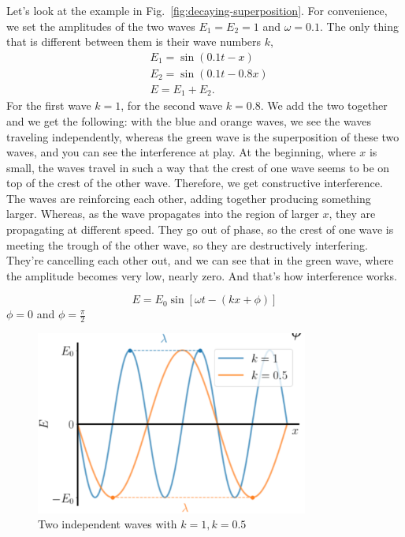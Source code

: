 Let's look at the example in Fig.~\ref{fig:decaying-superposition}. For convenience, we set the amplitudes of the two waves $E_1 = E_2 = 1$ and $\omega = 0.1$. The only thing that is different between them is their wave numbers $k$,
\begin{equation}
\begin{aligned}
&E_{1}=\sin (0.1 t-x) \\
&E_{2}=\sin (0.1 t-0.8 x) \\
&E=E_{1}+E_{2}.
\end{aligned}
\end{equation}
For the first wave $k=1$, for the second wave $k=0.8$. We add the two together and we get the following: with the blue and orange waves, we see the waves traveling independently, whereas the green wave is the superposition of these two waves, and you can see the interference at play. At the beginning, where $x$ is small, the waves travel in such a way that the crest of one wave seems to be on top of the crest of the other wave. Therefore, we get constructive interference. The waves are reinforcing each other, adding together producing something larger. Whereas, as the wave propagates into the region of larger $x$, they are propagating at different speed. They go out of phase, so the crest of one wave is meeting the trough of the other wave, so they are destructively interfering. They're cancelling each other out, and we can see that in the green wave, where the amplitude becomes very low, nearly zero. And that's how interference works.

\begin{equation}
E=E_{0} \sin [\omega t-(k x+\phi)]
\end{equation}
$\phi = 0$ and $\phi = \frac{\pi}{2}$
\fi

\begin{figure}[H]
   \centering
    \includegraphics[width=0.8\textwidth]{lesson6/k.pdf}
        \caption{Two independent waves with $k=1, k=0.5$}    
    \label{fig:two-waves}
\end{figure}

